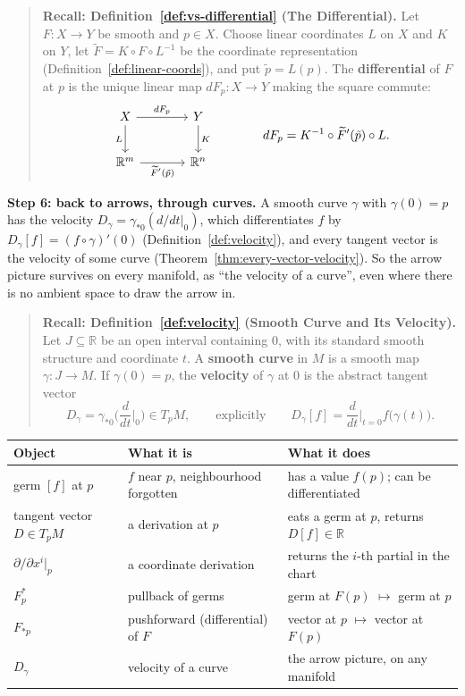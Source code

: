 \documentclass[11pt]{report}
\begin{document}
\begin{quote}
\textbf{Recall: Definition~\ref{def:vs-differential} (The Differential).} Let $F : X \to Y$ be smooth and $p \in X$. Choose linear coordinates $L$ on $X$ and $K$ on $Y$, let $\widetilde F = K \circ F \circ L^{-1}$ be the coordinate representation (Definition~\ref{def:linear-coords}), and put $\tilde p = L(p)$. The \textbf{differential} of $F$ at $p$ is the unique linear map $dF_p : X \to Y$ making the square commute:
\[
\begin{tikzcd}[row sep=2.2em, column sep=3.6em]
X \arrow[r, "dF_p"] \arrow[d, "L"'] & Y \arrow[d, "K"] \\
\mathbb{R}^m \arrow[r, "\widetilde F'(\tilde p)"'] & \mathbb{R}^n
\end{tikzcd}
\qquad\qquad dF_p = K^{-1} \circ \widetilde F'(\tilde p) \circ L.
\]
\end{quote}

\textbf{Step 6: back to arrows, through curves.} A smooth curve $\gamma$ with $\gamma(0) = p$ has the velocity $D_\gamma = \gamma_{*0}(d/dt|_0)$, which differentiates $f$ by $D_\gamma[f] = (f \circ \gamma)'(0)$ (Definition~\ref{def:velocity}), and every tangent vector is the velocity of some curve (Theorem~\ref{thm:every-vector-velocity}). So the arrow picture survives on every manifold, as ``the velocity of a curve'', even where there is no ambient space to draw the arrow in.

\begin{quote}
\textbf{Recall: Definition~\ref{def:velocity} (Smooth Curve and Its Velocity).} Let $J \subseteq \mathbb{R}$ be an open interval containing $0$, with its standard smooth structure and coordinate $t$. A \textbf{smooth curve} in $M$ is a smooth map $\gamma : J \to M$. If $\gamma(0) = p$, the \textbf{velocity} of $\gamma$ at $0$ is the abstract tangent vector
\[
D_\gamma = \gamma_{*0}\Big(\frac{d}{dt}\Big|_0\Big) \in T_pM, \qquad\text{explicitly}\qquad D_\gamma[f] = \frac{d}{dt}\Big|_{t=0} f\big(\gamma(t)\big).
\]
\end{quote}

\begin{center}
\renewcommand{\arraystretch}{1.3}
\begin{tabular}{p{} p{} p{}}
\hline
Object & What it is & What it does \\
\hline
germ $[f]$ at $p$ & $f$ near $p$, neighbourhood forgotten & has a value $f(p)$; can be differentiated \\
tangent vector $D \in T_pM$ & a derivation at $p$ & eats a germ at $p$, returns $D[f] \in \mathbb{R}$ \\
$\partial/\partial x^i|_p$ & a coordinate derivation & returns the $i$-th partial in the chart \\
$F_p^*$ & pullback of germs & germ at $F(p)$ $\mapsto$ germ at $p$ \\
$F_{*p}$ & pushforward (differential) of $F$ & vector at $p$ $\mapsto$ vector at $F(p)$ \\
$D_\gamma$ & velocity of a curve & the arrow picture, on any manifold \\
\hline
\end{tabular}
\end{center}
\end{document}

